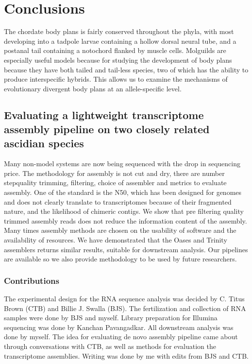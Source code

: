 \chapter{Conclusions}
The chordate body plans is fairly conserved throughout the phyla, with most developing into a tadpole larvae containing a hollow dorsal neural tube, and a postanal tail containing a notochord flanked by muscle cells. Molguilds are especially useful models because for studying the development of body plans because they have both tailed and tail-less species, two of which has the ability to produce interspecific hybrids. This allows us to examine the mechanisms of evolutionary divergent body plans at an allele-specific level. 

\section{Evaluating a lightweight transcriptome assembly pipeline on two closely related ascidian species}
Many non-model systems are now being sequenced with the drop in sequencing price. The methodology for assembly is not cut and dry, there are number step\textemdash quality trimming, filtering, choice of assembler and metrics to evaluate assembly. One of the standard is the N50, which has been designed for genomes and does not clearly translate to transcriptomes because of their fragmented nature, and the likelihood of chimeric contigs. We show that pre filtering quality trimmed assembly reads does not reduce the information content of the assembly. Many times assembly methods are chosen on the usability of software and the availability of resources. We have demonstrated that the Oases and Trinity assemblers returns similar results, suitable for downstream analysis. Our pipelines are available so we also provide methodology to be used by future researchers. 

\subsection{Contributions}
The experimental design for the RNA sequence analysis was decided by C. Titus Brown (CTB) and Billie J. Swalla (BJS). The fertilization and collection of RNA samples were done by BJS and myself. Library preparation for Illumina sequencing was done by Kanchan Pavangadkar. All downstream analysis was done by myself. The idea for evaluating de novo assembly pipeline came about through conversations with CTB, as well as methods for evaluation the transcriptome assemblies. Writing was done by me with edits from BJS and CTB.

